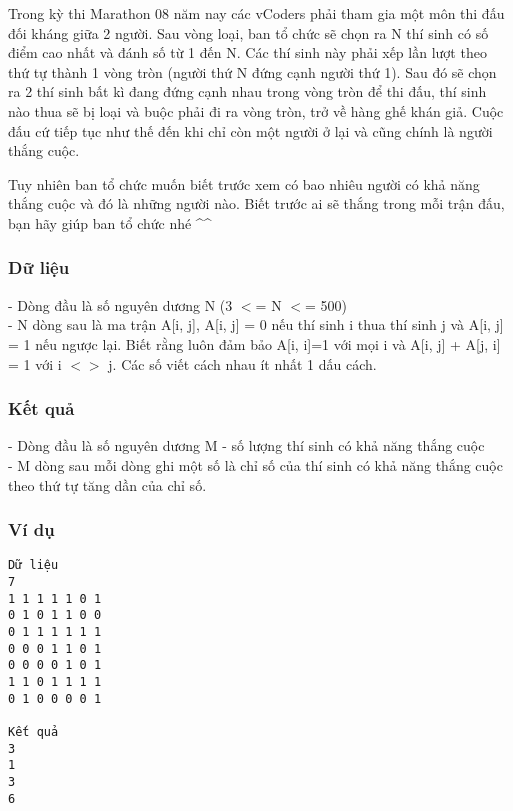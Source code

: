 



   Trong kỳ thi Marathon 08 năm nay các vCoders phải tham gia một môn thi đấu đối kháng giữa 2 người. Sau vòng loại, ban tổ chức sẽ chọn ra N thí sinh có số điểm cao nhất và đánh số từ 1 đến N. Các thí sinh này phải xếp lần lượt theo thứ tự thành 1 vòng tròn (người thứ N đứng cạnh người thứ 1). Sau đó sẽ chọn ra 2 thí sinh bất kì đang đứng cạnh nhau trong vòng tròn để thi đấu, thí sinh nào thua sẽ bị loại và buộc phải đi ra vòng tròn, trở về hàng ghế khán giả. Cuộc đấu cứ tiếp tục như thế đến khi chỉ còn một người ở lại và cũng chính là người thắng cuộc.  

   Tuy nhiên ban tổ chức muốn biết trước xem có bao nhiêu người có khả năng thắng cuộc và đó là những người nào. Biết trước ai sẽ thắng trong mỗi trận đấu, bạn hãy giúp ban tổ chức nhé \textasciicircum\textasciicircum  

\subsubsection{   Dữ liệu  }

   - Dòng đầu là số nguyên dương N (3 $<$= N $<$= 500)   
\\   - N dòng sau là ma trận A[i, j], A[i, j] = 0 nếu thí sinh i thua thí sinh j và A[i, j] = 1 nếu ngược lại. Biết rằng luôn đảm bảo A[i, i]=1 với mọi i và A[i, j] + A[j, i] = 1 với i $<$$>$ j. Các số viết cách nhau ít nhất 1 dấu cách.  

\subsubsection{   Kết quả  }

   - Dòng đầu là số nguyên dương M - số lượng thí sinh có khả năng thắng cuộc   
\\   - M dòng sau mỗi dòng ghi một số là chỉ số của thí sinh có khả năng thắng cuộc theo thứ tự tăng dần của chỉ số.  

\subsubsection{   Ví dụ  }
\begin{verbatim}
Dữ liệu
7
1 1 1 1 1 0 1
0 1 0 1 1 0 0
0 1 1 1 1 1 1
0 0 0 1 1 0 1
0 0 0 0 1 0 1
1 1 0 1 1 1 1
0 1 0 0 0 0 1

Kết quả
3
1
3
6
\end{verbatim}